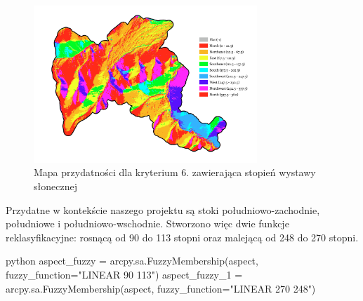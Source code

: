 \documentclass{article}
\begin{document}
\begin{figure}[H]
    \centering
    \includegraphics[width=0.75\textwidth]{img/kryterium6-aspect.jpg}
    \caption{Mapa przydatności dla kryterium 6. zawierająca stopień wystawy słonecznej}
\end{figure}
\vspace{10pt}

Przydatne w kontekście naszego projektu są stoki południowo-zachodnie, południowe i południowo-wschodnie. Stworzono więc dwie funkcje reklasyfikacyjne: rosnącą od 90 do 113 stopni oraz malejącą od 248 do 270 stopni. 
\vspace{5pt}

\begin{mintedbox}{python}
aspect_fuzzy = arcpy.sa.FuzzyMembership(aspect, fuzzy_function="LINEAR 90 113")
aspect_fuzzy_1 = arcpy.sa.FuzzyMembership(aspect, fuzzy_function="LINEAR 270 248")
\end{mintedbox}
\vspace{10pt}
\end{document}

